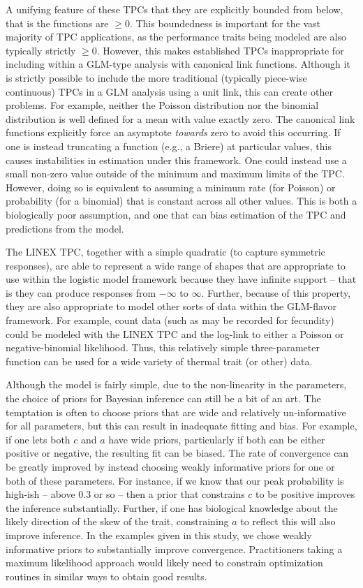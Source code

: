 \documentclass[
  12pt,
]{article}
\begin{document}
A unifying feature of these TPCs that they are explicitly bounded from
below, that is the functions are \(\geq 0\). This boundedness is
important for the vast majority of TPC applications, as the performance
traits being modeled are also typically strictly \(\geq 0\). However,
this makes established TPCs inappropriate for including within a
GLM-type analysis with canonical link functions. Although it is strictly
possible to include the more traditional (typically piece-wise
continuous) TPCs in a GLM analysis using a unit link, this can create
other problems. For example, neither the Poisson distribution nor the
binomial distribution is well defined for a mean with value exactly
zero. The canonical link functions explicitly force an asymptote
\emph{towards} zero to avoid this occurring. If one is instead
truncating a function (e.g., a Briere) at particular values, this causes
instabilities in estimation under this framework. One could instead use
a small non-zero value outside of the minimum and maximum limits of the
TPC. However, doing so is equivalent to assuming a minimum rate (for
Poisson) or probability (for a binomial) that is constant across all
other values. This is both a biologically poor assumption, and one that
can bias estimation of the TPC and predictions from the model.

The LINEX TPC, together with a simple quadratic (to capture symmetric
responses), are able to represent a wide range of shapes that are
appropriate to use within the logistic model framework because they have
infinite support -- that is they can produce responses from \(-\infty\)
to \(\infty\). Further, because of this property, they are also
appropriate to model other sorts of data within the GLM-flavor
framework. For example, count data (such as may be recorded for
fecundity) could be modeled with the LINEX TPC and the log-link to
either a Poisson or negative-binomial likelihood. Thus, this relatively
simple three-parameter function can be used for a wide variety of
thermal trait (or other) data.

Although the model is fairly simple, due to the non-linearity in the
parameters, the choice of priors for Bayesian inference can still be a
bit of an art. The temptation is often to choose priors that are wide
and relatively un-informative for all parameters, but this can result in
inadequate fitting and bias. For example, if one lets both \(c\) and
\(a\) have wide priors, particularly if both can be either positive or
negative, the resulting fit can be biased. The rate of convergence can
be greatly improved by instead choosing weakly informative priors for
one or both of these parameters. For instance, if we know that our peak
probability is high-ish -- above 0.3 or so -- then a prior that
constrains \(c\) to be positive improves the inference substantially.
Further, if one has biological knowledge about the likely direction of
the skew of the trait, constraining \(a\) to reflect this will also
improve inference. In the examples given in this study, we chose weakly
informative priors to substantially improve convergence. Practitioners
taking a maximum likelihood approach would likely need to constrain
optimization routines in similar ways to obtain good results.
\end{document}
